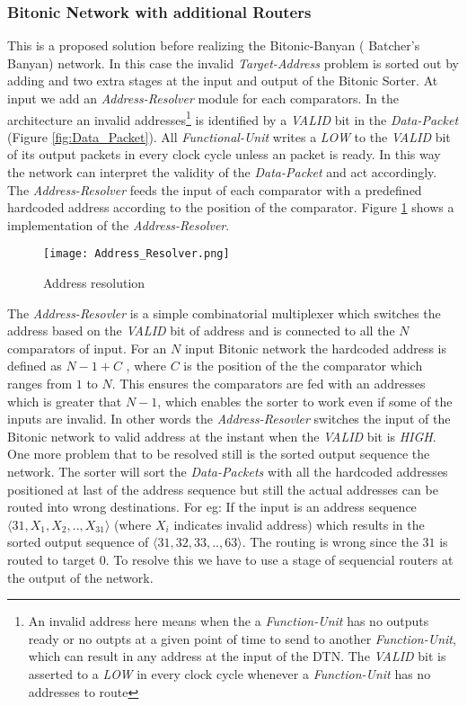				  \subsubsection{Bitonic Network with additional Routers}
					      This is a proposed solution before realizing the Bitonic-Banyan \cite{batcher_banyan_ref}( Batcher's Banyan)  network. In this case the invalid \textit{Target-Address} problem is sorted
					      out by adding and two extra stages at the input and output of the Bitonic Sorter. At input we add an \textit{Address-Resolver} module for each comparators. In the architecture an invalid 
					      addresses\footnote{An invalid address here means when the a \textit{Function-Unit} has no outputs ready or no outpts at a given point of time to send to another \textit{Function-Unit}, 
					      which can result in any address at the input of the DTN. The \textit{VALID} bit is asserted to a \textit{LOW} in every clock cycle whenever a \textit{Function-Unit} has no addresses to route}
					      is identified by a \textit{VALID} bit in the \textit{Data-Packet} (Figure \ref{fig:Data_Packet}). All \textit{Functional-Unit} writes a \textit{LOW} to the \textit{VALID} bit of its output packets in every clock cycle unless an packet is ready. 
					      In this way the network can interpret the validity of the \textit{Data-Packet} and act accordingly. The \textit{Address-Resolver} feeds the input of each comparator with a predefined hardcoded address according to the position of the comparator. 
					      Figure \ref{fig:Address_Resolver} shows a implementation of the \textit{Address-Resolver}.
					      \begin{figure}[!ht]
							\texttt{[image: Address\_Resolver.png]}
						      \caption{Address resolution}
					      \label{fig:Address_Resolver}
					      \end{figure}
					      The \textit{Address-Resovler} is a simple combinatorial multiplexer which switches the address based on the \textit{VALID} bit of address and is connected to all the $N$ comparators of input.
					      For an $N$ input Bitonic network the hardcoded address is defined as $N -1 + C$ , where $C$ is the position of the the comparator which ranges from $1$ to $N$. This ensures the 
					      comparators are fed with an addresses which is greater that $N -1$, which enables the sorter to work even if some of the inputs are invalid. In other words the \textit{Address-Resovler}
					      switches the input of the Bitonic network to  valid address at the instant when the \textit{VALID} bit is \textit{HIGH}. One  more problem that to be resolved
					      still is the sorted output sequence the network. The sorter will sort the \textit{Data-Packets} with all the hardcoded addresses positioned at last of the address sequence but still the actual addresses can
					      be routed into wrong destinations. For eg: If the input is an address sequence $\langle31,X_{1},X_{2},..,X_{31}\rangle$ (where $X_{i}$ indicates invalid address) which results in the sorted output sequence 
					      of $\langle31,32,33,..,63\rangle$. The routing is wrong since the $31$ is routed to target $0$. To resolve this we have to use a stage of sequencial routers at the output of the network.
					      
